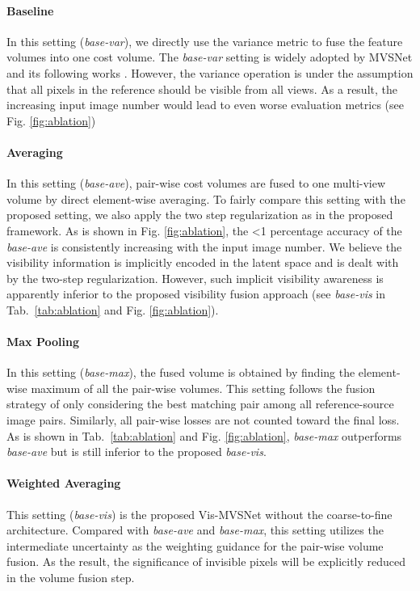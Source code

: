 \documentclass{bmvc2k}
\begin{document}
\vspace{-4mm}\paragraph{Baseline}
In this setting (\textit{base-var}), we directly use the variance metric to fuse the feature volumes into one cost volume. The \textit{base-var} setting is widely adopted by MVSNet and its following works \cite{yao2018mvsnet,chen2019point,yang2020cost,cheng2020deep,gu2020cascade}. However, the variance operation is under the assumption that all pixels in the reference should be visible from all views. As a result, the increasing input image number would lead to even worse evaluation metrics (see Fig. \ref{fig:ablation})

\vspace{-4mm}\paragraph{Averaging}
In this setting (\textit{base-ave}), pair-wise cost volumes are fused to one multi-view volume by direct element-wise averaging. To fairly compare this setting with the proposed setting, we also apply the two step regularization as in the proposed framework. As is shown in Fig. \ref{fig:ablation}, the <1 percentage accuracy of the \textit{base-ave} is consistently increasing with the input image number. We believe the visibility information is implicitly encoded in the latent space and is dealt with by the two-step regularization. However, such implicit visibility awareness is apparently inferior to the proposed visibility fusion approach (see \textit{base-vis} in Tab.\ \ref{tab:ablation} and Fig. \ref{fig:ablation}).

\vspace{-4mm}\paragraph{Max Pooling}
In this setting (\textit{base-max}), the fused volume is obtained by finding the element-wise maximum of all the pair-wise volumes. This setting follows the fusion strategy of only considering the best matching pair among all reference-source image pairs. Similarly, all pair-wise losses are not counted toward the final loss. As is shown in Tab.\ \ref{tab:ablation} and Fig. \ref{fig:ablation}, \textit{base-max} outperforms \textit{base-ave} but is still inferior to the proposed \textit{base-vis}.

\vspace{-4mm}\paragraph{Weighted Averaging}
This setting (\textit{base-vis}) is the proposed Vis-MVSNet without the coarse-to-fine architecture. Compared with \textit{base-ave} and \textit{base-max}, this setting utilizes the intermediate uncertainty as the weighting guidance for the pair-wise volume fusion. As the result, the significance of invisible pixels will be explicitly reduced in the volume fusion step. 
\end{document}
